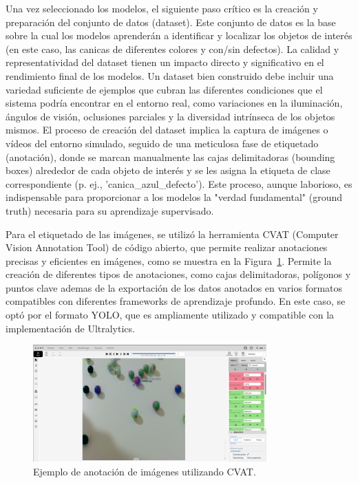 \documentclass[11pt,spanish,listoffigures,listoftables]{tfgetsinf}
\begin{document}
Una vez seleccionado los modelos, el siguiente paso crítico es la creación y preparación del conjunto de datos (dataset). Este conjunto de datos es la base sobre la cual los modelos aprenderán a identificar y localizar los objetos de interés (en este caso, las canicas de diferentes colores y con/sin defectos). La calidad y representatividad del dataset tienen un impacto directo y significativo en el rendimiento final de los modelos. Un dataset bien construido debe incluir una variedad suficiente de ejemplos que cubran las diferentes condiciones que el sistema podría encontrar en el entorno real, como variaciones en la iluminación, ángulos de visión, oclusiones parciales y la diversidad intrínseca de los objetos mismos. El proceso de creación del dataset implica la captura de imágenes o vídeos del entorno simulado, seguido de una meticulosa fase de etiquetado (anotación), donde se marcan manualmente las cajas delimitadoras (bounding boxes) alrededor de cada objeto de interés y se les asigna la etiqueta de clase correspondiente (p. ej., 'canica\_azul\_defecto'). Este proceso, aunque laborioso, es indispensable para proporcionar a los modelos la "verdad fundamental" (ground truth) necesaria para su aprendizaje supervisado.

Para el etiquetado de las imágenes, se utilizó la herramienta CVAT\cite{CVAT_ai_Corporation_Computer_Vision_Annotation_2023} (Computer Vision Annotation Tool) de código abierto, que permite realizar anotaciones precisas y eficientes en imágenes, como se muestra en la Figura~\ref{fig:cvat_anotacion}. Permite la creación de diferentes tipos de anotaciones, como cajas delimitadoras, polígonos y puntos clave ademas de la exportación de los datos anotados en varios formatos compatibles con diferentes frameworks de aprendizaje profundo. En este caso, se optó por el formato YOLO, que es ampliamente utilizado y compatible con la implementación de Ultralytics.

\begin{figure}[H]
   \centering
   \includegraphics[width=0.8\textwidth]{images/diseno_e_implementacion/ejemplo_CVAT.png}
   \caption{Ejemplo de anotación de imágenes utilizando CVAT.}
   \label{fig:cvat_anotacion}
\end{figure}
\end{document}
